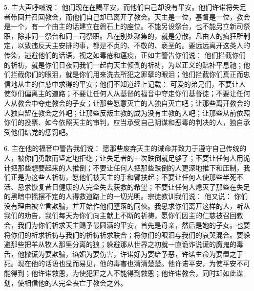 5. 主大声呼喊说： 他们现在在赐平安，而他们自己却没有平安。他们许诺将失足者带回并召回教会，而他们自己却已离开了教会。天主是一位，基督是一位，教会是一个，有一个由主的话建立在磐石上的座位。不能另设祭台，也不能另立新司祭职，除非同一祭台和同一司祭职。凡在别处聚集的，就是分散。凡由人的疯狂所制定，以致违反天主安排的事，都是不贞的、不敬的、亵圣的。要远远离开这类人的传染，逃避他们的话语，视之如毒疮和瘟疫，正如主警告你们说： 他们拦截你们的祈祷，就是你们日夜同我们一起向天主倾倒的祈祷，为以正义的赔补平息祂；他们拦截你们的眼泪，就是你们用来洗去所犯之罪孽的眼泪；他们拦截你们真正而忠信地从主的仁慈中求得的平安；他们不知道经上记载： 可爱的弟兄们，不要让人使你们偏离主的道路；不要让任何人从基督的福音中夺走你们基督徒；不要让任何人从教会中夺走教会的子女；让那些愿意灭亡的人独自灭亡吧；让那些离开教会的人独自留在教会之外吧；让那些反叛主教的成为没有主教的人吧；让那些从前依照你们的投票、如今依照天主的审判，应当承受自己阴谋和恶毒的判决的人，独自承受他们结党的惩罚吧。\par

6. 主在他的福音中警告我们说： 愿那些废弃天主的诫命并致力于遵守自己传统的人，被你们勇敢而坚定地拒绝；让失足者的一次跌倒就足够了；不要让任何人用诡计把那些想要起来的人推倒；不要让任何人把那些跌倒的人更深地推下和压制，我们正是为这些人祈祷，愿他们被天主的手和臂扶起；不要让任何人使那些半死不活、恳求恢复昔日健康的人完全失去获救的希望；不要让任何人熄灭了那些在失足的黑暗中摇摆不定的人得救道路上的一切光明。宗徒教训我们说： 他又说： 你们没有理由被空言欺骗，并开始作他们堕落的同伙。我恳求你们离开这样的人，听从我们的劝告，我们每天为你们向主献上不断的祈祷，愿你们因主的仁慈被召回教会，我们为你们祈求天主赐予最圆满的平安，首先是母亲，然后是她的子女。也要将你们的祈求祈祷与我们的祈祷祈求联合；将你们的眼泪与我们的哀哭混合。要躲避那些把羊从牧人那里分离的狼；躲避那从世界之初就一直诡诈说谎的魔鬼的毒舌，他撒谎为要欺骗，谄媚为要伤害，许诺好为要给予恶，许诺生命为要置之于死。现在他的话语也显而易见，他的毒害也清清楚楚。他许诺平安，为使平安不可能得到；他许诺救恩，为使犯罪之人不能得到救恩；他许诺教会，同时却如此谋划，使相信他的人完全丧亡于教会之外。\par

